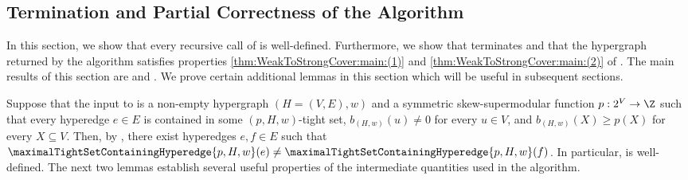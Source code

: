 \subsection{Termination and Partial Correctness of the Algorithm}
\label{sec:WeakToStrongCover:PartialCorrectness}
In this section, we show that every recursive call of  is well-defined. 
Furthermore, we show that  terminates and that the hypergraph returned by the algorithm satisfies properties \ref{thm:WeakToStrongCover:main:(1)} and \ref{thm:WeakToStrongCover:main:(2)} of . The main results of this section are  and . We prove certain additional lemmas in this section which will be useful in subsequent sections. 
 
    Suppose that the input to  is a non-empty hypergraph $(H = (V, E), w)$ and a symmetric skew-supermodular function $p:2^V\rightarrow \Z$ 
such that every hyperedge $e \in E$ is contained in some $(p, H, w)$-tight set, $b_{(H,w)}(u) \not = 0$ for every $u \in V$, and $b_{(H,w)}(X) \geq p(X)$ for every $X \subseteq V$. 
  Then, by , there exist hyperedges $e , f \in E$ such that $\maximalTightSetContainingHyperedge{p, H, w}(e) \not = \maximalTightSetContainingHyperedge{p, H, w}(f)$. In particular,   is well-defined. 
  The next two lemmas establish several useful properties of the intermediate quantities used in the algorithm.

